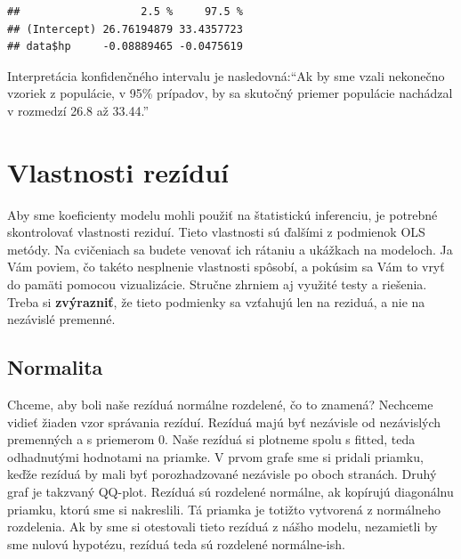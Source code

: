 \begin{Shaded}
\begin{Highlighting}[]

\end{Highlighting}
\end{Shaded}

\begin{verbatim}
##                   2.5 %     97.5 %
## (Intercept) 26.76194879 33.4357723
## data$hp     -0.08889465 -0.0475619
\end{verbatim}

Interpretácia konfidenčného intervalu je nasledovná:``Ak by sme vzali
nekonečno vzoriek z populácie, v 95\% prípadov, by sa skutočný priemer
populácie nachádzal v rozmedzí 26.8 až 33.44.''

\newpage

\hypertarget{vlastnosti-reziduuxed}{%
\section{Vlastnosti rezíduí}\label{vlastnosti-reziduuxed}}

Aby sme koeficienty modelu mohli použiť na štatistickú inferenciu, je
potrebné skontrolovať vlastnosti reziduí. Tieto vlastnosti sú ďalšími z
podmienok OLS metódy. Na cvičeniach sa budete venovať ich rátaniu a
ukážkach na modeloch. Ja Vám poviem, čo takéto nesplnenie vlastnosti
spôsobí, a pokúsim sa Vám to vryť do pamäti pomocou vizualizácie.
Stručne zhrniem aj využité testy a riešenia. Treba si
\textbf{zvýrazniť}, že tieto podmienky sa vzťahujú len na reziduá, a nie
na nezávislé premenné.

\hypertarget{normalita}{%
\subsection{Normalita}\label{normalita}}

Chceme, aby boli naše rezíduá normálne rozdelené, čo to znamená?
Nechceme vidieť žiaden vzor správania rezíduí. Rezíduá majú byť
nezávisle od nezávislých premenných a s priemerom 0. Naše rezíduá si
plotneme spolu s fitted, teda odhadnutými hodnotami na priamke. V prvom
grafe sme si pridali priamku, keďže rezíduá by mali byť porozhadzované
nezávisle po oboch stranách. Druhý graf je takzvaný QQ-plot. Rezíduá sú
rozdelené normálne, ak kopírujú diagonálnu priamku, ktorú sme si
nakreslili. Tá priamka je totižto vytvorená z normálneho rozdelenia. Ak
by sme si otestovali tieto rezíduá z nášho modelu, nezamietli by sme
nulovú hypotézu, rezíduá teda sú rozdelené normálne-ish.

